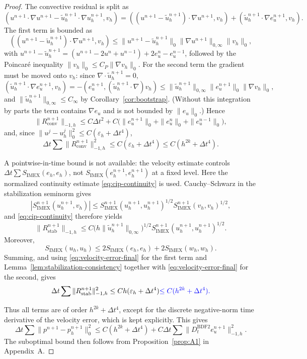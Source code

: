 \documentclass[11pt]{article}
\theoremstyle{remark}\newtheorem{remark}{Remark}
\newcommand{\Dt}{D_t^{\mathrm{BDF2}}}
\newcommand{\tu}{\tilde u_h}
\newcommand{\Simex}{S_{\mathrm{IMEX}}}
\theoremstyle{plain}
\newcommand{\new}[1]{{\color{blue}#1}}
\begin{document}
\begin{proof}
The convective residual is split
as
\[(u^{n+1}\!\cdot\!\nabla u^{n+1}-\tu^{n+1}\!\cdot\!\nabla u_h^{n+1},v_h)=((u^{n+1}-\tu^{n+1})\!\cdot\!\nabla u^{n+1},v_h)+(\tu^{n+1}\!\cdot\!\nabla e_u^{n+1},v_h).\]
The first term is bounded as
\[
((u^{n+1}-\tu^{n+1})\cdot\nabla u^{n+1},v_h)\le\|u^{n+1}-\tu^{n+1}\|_0\|\nabla u^{n+1}\|_{0,\infty}\|v_h\|_0,
\]
with $u^{n+1}-\tu^{n+1}=(u^{n+1}-2u^n+u^{n-1})+2e_u^n-e_u^{n-1}$\new{, followed by the Poincar\'e inequality $\|v_h\|_0\le C_P\|\nabla v_h\|_0$}. For the second term the gradient must be moved onto $v_h$: since $\nabla\cdot\tu^{n+1}=0$,
\[
(\tu^{n+1}\!\cdot\!\nabla e_u^{n+1},v_h)=-(e_u^{n+1},(\tu^{n+1}\!\cdot\!\nabla)v_h)\le\|\tu^{n+1}\|_{0,\infty}\|e_u^{n+1}\|_0\|\nabla v_h\|_0,
\]
and $\|\tu^{n+1}\|_{0,\infty}\le C_\infty$ by Corollary~\ref{cor:bootstrap}. (Without this integration by parts the term contains $\nabla e_u$ and is not bounded by $\|e_u\|_0$.) Hence
\[\|R_{\mathrm{conv}}^{n+1}\|_{-1,h}\le C\Delta t^2+C\big(\|e_u^{n+1}\|_0+\|e_u^n\|_0+\|e_u^{n-1}\|_0\big),\]
and, since $\|u^j-u_h^j\|_0^2\le C(\varepsilon_h+\Delta t^4)$,
\[
\Delta t\sum\|R^{n+1}_{\mathrm{conv}}\|_{-1,h}^2\le C(\varepsilon_h+\Delta t^4)\le C(h^{2k}+\Delta t^4).
\]

{
A pointwise-in-time bound is not available: the velocity estimate controls $\Delta t\sum\Simex(e_h,e_h)$, not $\Simex(e_h^{n+1},e_h^{n+1})$ at a fixed level. Here the normalized continuity estimate \eqref{eq:cip-continuity} is used. Cauchy--Schwarz in the stabilization seminorm gives
\[
|\Simex^{n+1}(u_h^{n+1},v_h)|
\le \Simex^{n+1}(u_h^{n+1},u_h^{n+1})^{1/2}
\Simex^{n+1}(v_h,v_h)^{1/2},
\]
and \eqref{eq:cip-continuity} therefore yields
\[
\|R^{n+1}_{\mathrm{stab}}\|_{-1,h}
\le C\big(h\|\tu^{n+1}\|_{0,\infty}\big)^{1/2}
\Simex^{n+1}(u_h^{n+1},u_h^{n+1})^{1/2}.
\]
Moreover,
\[
\Simex(u_h,u_h)\le2\Simex(e_h,e_h)+2\Simex(w_h,w_h).
\]
}
\new{Summing, and using \eqref{eq:velocity-error-final} for the first term and Lemma~\ref{lem:stabilization-consistency} together with \eqref{eq:velocity-error-final} for the second, gives}
\[
\Delta t\sum\|R^{n+1}_{\mathrm{stab}}\|_{-1,h}^2\le Ch(\varepsilon_h+\Delta t^4)\new{\le C(h^{2k}+\Delta t^4).}
\]

Thus all terms are of order $h^{2k}+\Delta t^4$, except for the discrete negative-norm time derivative of the velocity error, which is kept explicitly. This gives
\[
\Delta t\sum\|p^{n+1}-p_h^{n+1}\|_0^2\le C(h^{2k}+\Delta t^4)+C\Delta t\sum\|\Dt e_u^{n+1}\|_{-1,h}^2.
\]
The suboptimal bound then follows from Proposition~\ref{prop:A1} in Appendix~A.
\end{proof}
\end{document}
